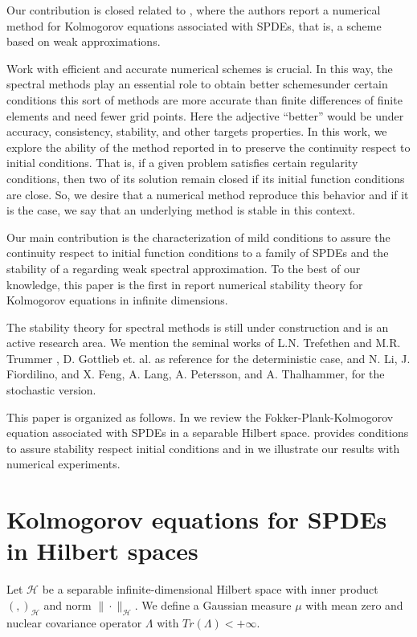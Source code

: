 \documentclass[]{interact}
\theoremstyle{plain}%
\theoremstyle{definition}
\theoremstyle{remark}
\begin{document}
        Our contribution is closed related to 
    \cite{de-fl}, where the authors report a numerical method for Kolmogorov 
    equations associated with SPDEs, that is, a scheme based on  weak 
    approximations.
    
        Work with efficient and accurate numerical schemes is 
    crucial. In this way, the spectral methods play an essential role to obtain 
    better schemes\textemdash under certain conditions this sort of methods 
    are  more accurate than finite differences of finite elements and need 
    fewer grid points. Here the adjective ``better'' would be under accuracy, 
    consistency, stability, and other targets properties. In this work, we 
    explore the ability of the method reported in \cite{de-fl} to preserve the 
    continuity respect to initial conditions. That is, if a given problem 
    satisfies certain regularity conditions, then two of its solution remain 
    closed if its initial function conditions are close. So, we desire that a 
    numerical method reproduce this 
    behavior and if it is the case, we say that an underlying method is stable 
    in this context.
    
        Our main contribution is the characterization of mild conditions to
    assure the continuity respect to initial function conditions to a family of
    SPDEs and the stability of a regarding weak spectral approximation. 
    To the best of our knowledge, this paper is the first in report numerical 
    stability theory for Kolmogorov equations in infinite dimensions.
    
        The stability theory for spectral methods is still under 
    construction and is an active research area. We mention the seminal works of
    L.N. Trefethen and M.R. Trummer \cite{Trefethen1987}, D. Gottlieb et. al.
    \cite{Gottlieb1987a} as reference for the deterministic case, and N. Li, J.
    Fiordilino, and X. Feng, \cite{Li2019} A. Lang, A. Petersson,  and A.
    Thalhammer, \cite{Lang2017} for the stochastic version.
    
        This paper is organized as follows. In  we review the
    Fokker-Plank-Kolmogorov equation associated with SPDEs in
    a separable Hilbert space.  
    provides conditions to assure stability respect initial conditions and in 
     we illustrate our
    results with numerical experiments.

\section{Kolmogorov equations for SPDEs in Hilbert spaces}
\label{fpk-sect}
        Let $\mathcal{H}$ be a separable infinite-dimensional Hilbert space with
    inner product $( ,  )_\mathcal{H} $ and norm $\|\cdot\|_\mathcal{H}$. We 
    define a Gaussian measure $\mu$ with mean zero and nuclear covariance 
    operator $\Lambda$ with  $Tr(\Lambda)<+\infty$.
\end{document}
